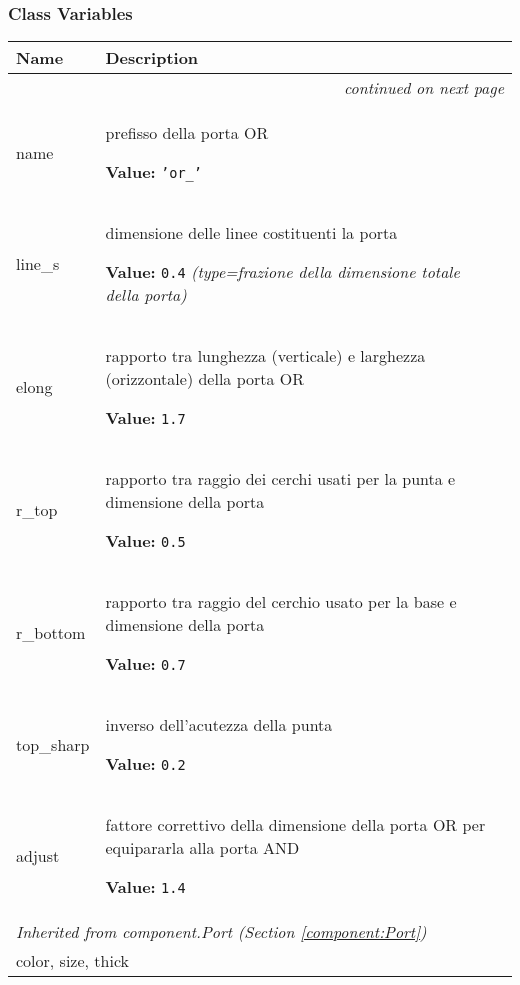 
  \subsubsection{Class Variables}

    \vspace{-1cm}
\hspace{\varindent}\begin{longtable}{|p{\varnamewidth}|p{\vardescrwidth}|l}
\cline{1-2}
\cline{1-2} \centering \textbf{Name} & \centering \textbf{Description}& \\
\cline{1-2}
\endhead\cline{1-2}\multicolumn{3}{r}{\small\textit{continued on next page}}\\\endfoot\cline{1-2}
\endlastfoot\raggedright n\-a\-m\-e\- & \raggedright prefisso della porta OR

\textbf{Value:} 
{\tt \texttt{'}\texttt{or\_}\texttt{'}}&\\
\cline{1-2}
\raggedright l\-i\-n\-e\-\_\-s\- & \raggedright dimensione delle linee costituenti la porta

\textbf{Value:} 
{\tt 0.4}            {\it (type=frazione della dimensione totale della porta)}&\\
\cline{1-2}
\raggedright e\-l\-o\-n\-g\- & \raggedright rapporto tra lunghezza (verticale) e larghezza (orizzontale) 
          della porta OR

\textbf{Value:} 
{\tt 1.7}&\\
\cline{1-2}
\raggedright r\-\_\-t\-o\-p\- & \raggedright rapporto tra raggio dei cerchi usati per la punta e dimensione 
          della porta

\textbf{Value:} 
{\tt 0.5}&\\
\cline{1-2}
\raggedright r\-\_\-b\-o\-t\-t\-o\-m\- & \raggedright rapporto tra raggio del cerchio usato per la base e dimensione 
          della porta

\textbf{Value:} 
{\tt 0.7}&\\
\cline{1-2}
\raggedright t\-o\-p\-\_\-s\-h\-a\-r\-p\- & \raggedright inverso dell'acutezza della punta

\textbf{Value:} 
{\tt 0.2}&\\
\cline{1-2}
\raggedright a\-d\-j\-u\-s\-t\- & \raggedright fattore correttivo della dimensione della porta OR per 
          equipararla alla porta AND

\textbf{Value:} 
{\tt 1.4}&\\
\cline{1-2}
\multicolumn{2}{|l|}{\textit{Inherited from component.Port \textit{(Section \ref{component:Port})}}}\\
\multicolumn{2}{|p{\varwidth}|}{\raggedright color, size, thick}\\
\cline{1-2}
\end{longtable}


